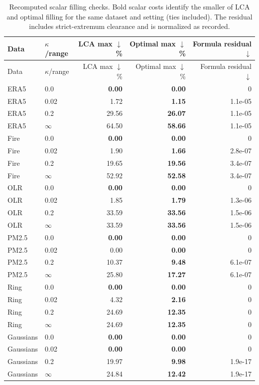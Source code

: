\begingroup\small\setlength{\tabcolsep}{4pt}
\begin{longtable}{llrrr}
\caption{Recomputed scalar filling checks. Bold scalar costs identify the smaller of LCA and optimal filling for the same dataset and setting (ties included). The residual includes strict-extremum clearance and is normalized as recorded.}\\\toprule
Data & $\kappa$/range & LCA max $\downarrow$ \% & Optimal max $\downarrow$ \% & Formula residual $\downarrow$\\\midrule\endfirsthead
\toprule Data & $\kappa$/range & LCA max $\downarrow$ \% & Optimal max $\downarrow$ \% & Formula residual $\downarrow$\\\midrule\endhead
\bottomrule\endfoot
ERA5 & 0.0 & \textbf{0.00} & \textbf{0.00} & 0\\
ERA5 & 0.02 & 1.72 & \textbf{1.15} & 1.1e-05\\
ERA5 & 0.2 & 29.56 & \textbf{26.07} & 1.1e-05\\
ERA5 & $\infty$ & 64.50 & \textbf{58.66} & 1.1e-05\\
Fire & 0.0 & \textbf{0.00} & \textbf{0.00} & 0\\
Fire & 0.02 & 1.90 & \textbf{1.66} & 2.8e-07\\
Fire & 0.2 & 19.65 & \textbf{19.56} & 3.4e-07\\
Fire & $\infty$ & 52.92 & \textbf{52.58} & 3.4e-07\\
OLR & 0.0 & \textbf{0.00} & \textbf{0.00} & 0\\
OLR & 0.02 & 1.85 & \textbf{1.79} & 1.3e-06\\
OLR & 0.2 & 33.59 & \textbf{33.56} & 1.5e-06\\
OLR & $\infty$ & 33.59 & \textbf{33.56} & 1.5e-06\\
PM2.5 & 0.0 & \textbf{0.00} & \textbf{0.00} & 0\\
PM2.5 & 0.02 & 0.00 & \textbf{0.00} & 0\\
PM2.5 & 0.2 & 10.37 & \textbf{9.48} & 6.1e-07\\
PM2.5 & $\infty$ & 25.80 & \textbf{17.27} & 6.1e-07\\
Ring & 0.0 & \textbf{0.00} & \textbf{0.00} & 0\\
Ring & 0.02 & 4.32 & \textbf{2.16} & 0\\
Ring & 0.2 & 24.69 & \textbf{12.35} & 0\\
Ring & $\infty$ & 24.69 & \textbf{12.35} & 0\\
Gaussians & 0.0 & \textbf{0.00} & \textbf{0.00} & 0\\
Gaussians & 0.02 & \textbf{0.00} & \textbf{0.00} & 0\\
Gaussians & 0.2 & 19.97 & \textbf{9.98} & 1.9e-17\\
Gaussians & $\infty$ & 24.84 & \textbf{12.42} & 1.9e-17\\
\end{longtable}\endgroup

